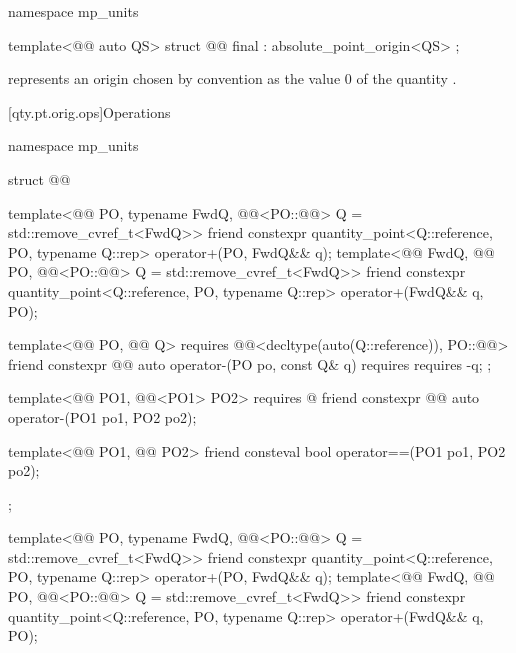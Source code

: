 \begin{codeblock}
namespace mp_units {

template<@@ auto QS>
struct @@ final : absolute_point_origin<QS> {};

}
\end{codeblock}

\pnum
{} represents an origin
chosen by convention as the value $0$ of the quantity .

[qty.pt.orig.ops]{Operations}

\begin{codeblock}
namespace mp_units {

struct @@ {
  template<@@ PO, typename FwdQ,
           @@<PO::@@> Q = std::remove_cvref_t<FwdQ>>
  friend constexpr quantity_point<Q::reference, PO{}, typename Q::rep> operator+(PO, FwdQ&& q);
  template<@@ FwdQ, @@ PO,
           @@<PO::@@> Q = std::remove_cvref_t<FwdQ>>
  friend constexpr quantity_point<Q::reference, PO{}, typename Q::rep> operator+(FwdQ&& q, PO);

  template<@@ PO, @@ Q>
    requires @@<decltype(auto(Q::reference)), PO::@@>
  friend constexpr @@ auto operator-(PO po, const Q& q)
    requires requires { -q; };

  template<@@ PO1, @@<PO1{}> PO2>
    requires @\seebelownc@
  friend constexpr @@ auto operator-(PO1 po1, PO2 po2);

  template<@@ PO1, @@ PO2>
  friend consteval bool operator==(PO1 po1, PO2 po2);
};

}
\end{codeblock}

\begin{itemdecl}
template<@@ PO, typename FwdQ,
         @@<PO::@@> Q = std::remove_cvref_t<FwdQ>>
friend constexpr quantity_point<Q::reference, PO{}, typename Q::rep> operator+(PO, FwdQ&& q);
template<@@ FwdQ, @@ PO,
         @@<PO::@@> Q = std::remove_cvref_t<FwdQ>>
friend constexpr quantity_point<Q::reference, PO{}, typename Q::rep> operator+(FwdQ&& q, PO);
\end{itemdecl}

